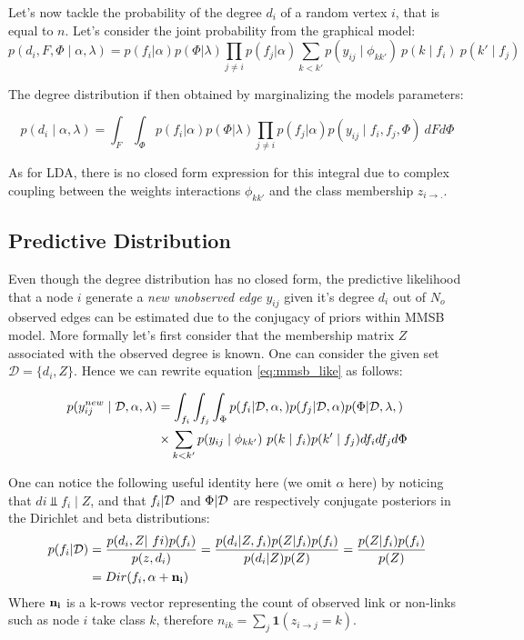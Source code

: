 \documentclass[a4paper, 12pt]{article}
\begin{document}
Let's now tackle the probability of the degree $d_i$ of a random vertex $i$, that is equal to $n$. Let's consider the joint probability from the graphical model:
\begin{equation}
p(d_i, F, \Phi \mid \alpha, \lambda) = p(f_i| \alpha)p(\Phi|\lambda) \prod_{j\neq i} p(f_j|\alpha) \sum_{k<k'} p(y_{ij} \mid \phi_{kk'})\ p(k\mid f_i)\ p(k'\mid f_j)
\end{equation}

The degree distribution if then obtained by marginalizing the models parameters:

\begin{equation}
p(d_i \mid \alpha, \lambda) = \int_F \int_\Phi p(f_i| \alpha)p(\Phi|\lambda) \prod_{j\neq i} p(f_j|\alpha) p(y_{ij} \mid f_i, f_j, \Phi) \ dF d\Phi
\end{equation}

As for LDA, there is no closed form expression for this integral due to complex coupling between the weights interactions $\phi_{kk'}$ and the class membership $z_{i\rightarrow .}$. 

\subsection{Predictive Distribution}
Even though the degree distribution has no closed form, the predictive likelihood that a node $i$ generate a \emph{new unobserved edge} $y_{ij}$ given it's degree $d_i$ out of $N_o$ observed edges can be estimated due to the conjugacy of priors within MMSB model. More formally let's first consider that the membership matrix $Z$ associated with the observed degree is known. One can consider the given set $\mathcal{D} = \{d_i, Z\}$. Hence we can rewrite equation \eqref{eq:mmsb_like} as follows:

\begin{align} \label{eq:pred}
p(y_{ij}^{new} \mid \mathcal{D}, \alpha, \lambda) &= \int_{f_i} \int_{f_j} \int_{\Phi} p(f_i|\mathcal{D}, \alpha, ) p(f_j|\mathcal{D}, \alpha)p(\Phi|\mathcal{D}, \lambda, ) \\
&\times \sum_{k<k'} p(y_{ij} \mid \phi_{kk'})\ p(k\mid f_i)p(k'\mid f_j)df_i df_j d\Phi
\end{align}

One can notice the following useful identity here (we omit $\alpha$ here) by noticing that $di \Perp f_i \mid Z$, and that  $f_i | \mathcal{D}$ and  $\Phi | \mathcal{D}$  are respectively  conjugate posteriors in the Dirichlet and beta distributions:
\begin{align}
p(f_i|\D) &= \frac{p(d_i, Z | fi) p(f_i)}{p(z, d_i)} = \frac{p(d_i|Z, f_i) p(Z|f_i) p(f_i)}{ p(d_i|Z)p(Z)} =  \frac{ p(Z|f_i) p(f_i)}{p(Z)} \\
&= Dir(f_i, \mat{\alpha} + \mat{n_i})
\end{align}
Where $\mathbf{n_i}$ is a k-rows vector representing the count of observed link or non-links such as node $i$ take class $k$, therefore $n_{ik} = \sum_j \bm{1}( z_{i\rightarrow j}=k)$.
\end{document}
